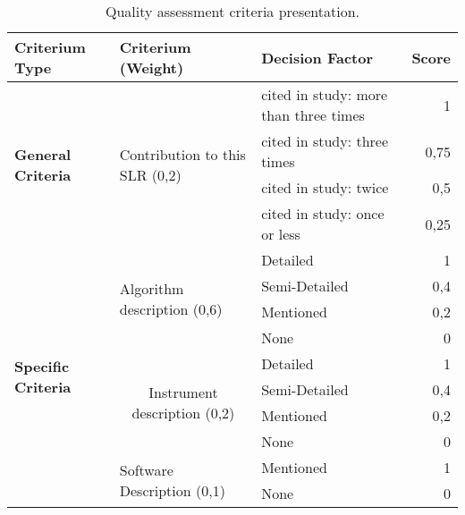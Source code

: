 \begin{table}
    \centering
    \caption{Quality assessment criteria presentation.}
    \label{tab:quality_assessment_criteria}
        \begin{small}
            \begin{tabularx}{\textwidth}{lXXr}%
                \textbf{Criterium Type} & \textbf{Criterium (Weight)} & \textbf{Decision Factor} & \textbf{Score} \\ \midrule
                \multirow{4}{*}{\textbf{General Criteria}} &
                \multirow{4}{*}{Contribution to this SLR (0,2)} & cited in study: more than three times & 1 \\
                 &  & cited in study: three times & 0,75 \\
                 &  & cited in study: twice & 0,5 \\
                 &  & cited in study: once or less & 0,25 \\ \midrule
                \multicolumn{1}{l}{\multirow{10}{*}{\textbf{Specific Criteria}}}
                & \multirow{4}{*}{Algorithm description (0,6)} & Detailed & 1 \\
                \multicolumn{1}{l}{} &  & Semi-Detailed & 0,4 \\
                \multicolumn{1}{l}{} &  & Mentioned & 0,2 \\
                \multicolumn{1}{l}{} &  & None & 0 \\ \cmidrule(l){2-4} 
                \multicolumn{1}{l}{} &
                \multicolumn{1}{c}{\multirow{4}{*}{Instrument description (0,2)}} & Detailed & 1 \\
                \multicolumn{1}{l}{} & \multicolumn{1}{c}{} & Semi-Detailed & 0,4 \\
                \multicolumn{1}{l}{} & \multicolumn{1}{c}{} & Mentioned & 0,2 \\
                \multicolumn{1}{l}{} & \multicolumn{1}{c}{} & None & 0 \\ \cmidrule(l){2-4} 
                \multicolumn{1}{l}{} & \multirow{2}{*}{Software Description (0,1)} & Mentioned & 1 \\
                \multicolumn{1}{l}{} &  & None & 0 \\ \bottomrule
            \end{tabularx}    
        \end{small}
    
\end{table}

